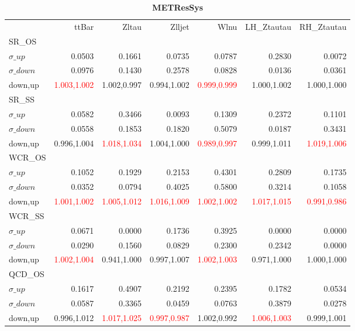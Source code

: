 \documentclass[11pt,oneside,a4paper]{article}
\begin{document}
\begin{table}
\centering
\caption{\bf{METResSys}}
\begin{tabular}{lrrrrrr}
 & ttBar & Zltau & Zlljet & Wlnu & LH\_Ztautau & RH\_Ztautau \\
SR\_OS &  &  &  &  &  &  \\
$\sigma\_up$ & 0.0503 & 0.1661 & 0.0735 & 0.0787 & 0.2830 & 0.0072 \\
$\sigma\_down$ & 0.0976 & 0.1430 & 0.2578 & 0.0828 & 0.0136 & 0.0361 \\
down,up & \textcolor{red}{1.003,1.002} & 1.002,0.997 & 0.994,1.002 & \textcolor{red}{0.999,0.999} & 1.000,1.002 & 1.000,1.000 \\

\hline
SR\_SS &  &  &  &  &  &  \\
$\sigma\_up$ & 0.0582 & 0.3466 & 0.0093 & 0.1309 & 0.2372 & 0.1101 \\
$\sigma\_down$ & 0.0558 & 0.1853 & 0.1820 & 0.5079 & 0.0187 & 0.3431 \\
down,up & 0.996,1.004 & \textcolor{red}{1.018,1.034} & 1.004,1.000 & \textcolor{red}{0.989,0.997} & 0.999,1.011 & \textcolor{red}{1.019,1.006} \\

\hline
WCR\_OS &  &  &  &  &  &  \\
$\sigma\_up$ & 0.1052 & 0.1929 & 0.2153 & 0.4301 & 0.2809 & 0.1735 \\
$\sigma\_down$ & 0.0352 & 0.0794 & 0.4025 & 0.5800 & 0.3214 & 0.1058 \\
down,up & \textcolor{red}{1.001,1.002} & \textcolor{red}{1.005,1.012} & \textcolor{red}{1.016,1.009} & \textcolor{red}{1.002,1.002} & \textcolor{red}{1.017,1.015} & \textcolor{red}{0.991,0.986} \\

\hline
WCR\_SS &  &  &  &  &  &  \\
$\sigma\_up$ & 0.0671 & 0.0000 & 0.1736 & 0.3925 & 0.0000 & 0.0000 \\
$\sigma\_down$ & 0.0290 & 0.1560 & 0.0829 & 0.2300 & 0.2342 & 0.0000 \\
down,up & \textcolor{red}{1.002,1.004} & 0.941,1.000 & 0.997,1.007 & \textcolor{red}{1.002,1.003} & 0.971,1.000 & 1.000,1.000 \\

\hline
QCD\_OS &  &  &  &  &  &  \\
$\sigma\_up$ & 0.1617 & 0.4907 & 0.2192 & 0.2395 & 0.1782 & 0.0534 \\
$\sigma\_down$ & 0.0587 & 0.3365 & 0.0459 & 0.0763 & 0.3879 & 0.0278 \\
down,up & 0.996,1.012 & \textcolor{red}{1.017,1.025} & \textcolor{red}{0.997,0.987} & 1.002,0.992 & \textcolor{red}{1.006,1.003} & 0.999,1.001 \\


\end{tabular}
\end{table}
\end{document}
